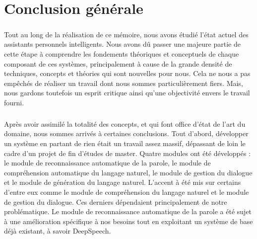 \chapter*{Conclusion générale}


\paragraph{}
Tout au long de la réalisation de ce mémoire, nous avons étudié l'état actuel des assistants personnels intelligents. Nous avons dû passer une majeure partie de cette étape à comprendre les fondements théoriques et conceptuels de chaque composant de ces systèmes, principalement à cause de la grande densité de techniques, concepts et théories qui sont nouvelles pour nous. Cela ne nous a pas empêchés de réaliser un travail dont nous sommes particulièrement fiers. Mais, nous gardons toutefois un esprit critique ainsi qu'une objectivité envers le travail fourni. 

\paragraph{}
Après avoir assimilé la totalité des concepts, et qui font office d'état de l'art du domaine, nous sommes arrivés à certaines conclusions. Tout d'abord, développer un système en partant de rien était un travail assez massif, dépassant de loin le cadre d'un projet de fin d'études de master. Quatre modules ont été développés : le module de reconnaissance automatique de la parole, le module de compréhension automatique du langage naturel, le module de gestion du dialogue et le module de génération du langage naturel. L'accent à été mis sur certains d'entre eux comme le module de compréhension du langage naturel et le module de gestion du dialogue. Ces derniers dépendaient principalement de notre problématique. Le module de reconnaissance automatique de la parole a été sujet à une amélioration spécifique à nos besoins tout en exploitant un système de base déjà existant, à savoir DeepSpeech.


